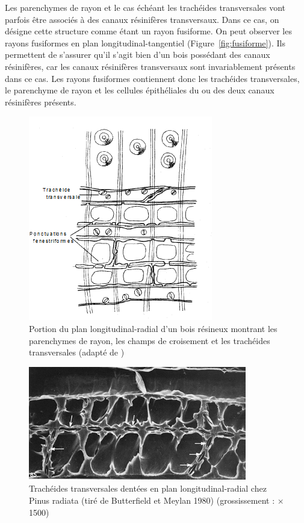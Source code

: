 Les parenchymes de rayon et le cas échéant les trachéides transversales vont parfois être associés à des canaux résinifères transversaux. Dans ce cas, on désigne cette structure comme étant un rayon fusiforme. On peut observer les rayons fusiformes en plan longitudinal-tangentiel (Figure~\ref{fig:fusiforme}). Ils permettent de s'assurer qu'il s'agit bien d'un bois possédant des canaux résinifères, car les canaux résinifères transversaux sont invariablement présents dans ce cas. Les rayons fusiformes contiennent donc les trachéides transversales, le parenchyme de rayon et les cellules épithéliales du ou des deux canaux résinifères présents.

\begin{figure}[h]
	\centering
	\includegraphics[scale=0.8]{img/ch3_Fahn_trach}
	\caption{Portion du plan longitudinal-radial d’un bois résineux montrant les parenchymes de rayon, les champs de croisement et les trachéides transversales (adapté de \cite{fahn1990plant})}
	\label{fig:trach_trans}
\end{figure}

\begin{figure}[h]
\centering
\includegraphics[scale=0.7]{img/ch3_dentees}
\caption{Trachéides transversales dentées en plan longitudinal-radial chez Pinus radiata (tiré de Butterfield et Meylan 1980) (grossissement : $\times$1500)}
\label{fig:dentees}
\end{figure}


